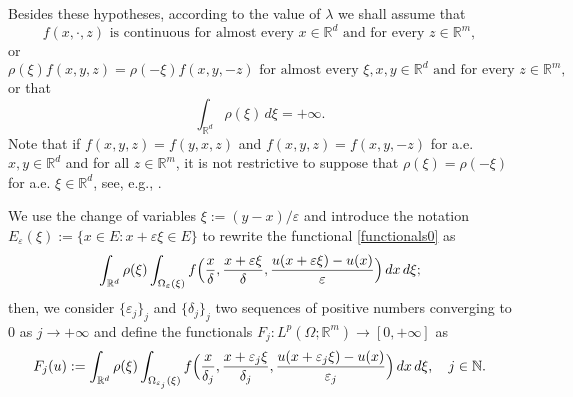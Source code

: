 \documentclass{article}
\theoremstyle{definition}
\newcommand{\e}{\varepsilon}
\newcommand{\ej}{\varepsilon_j}
\newcommand{\dej}{\delta_j}
\newcommand{\N}{\mathbb{N}}
\newcommand{\R}{\mathbb{R}}
\begin{document}
Besides these hypotheses, according to the value of $\lambda$ we shall assume that
\begin{equation} \label{f : continuous}
    \tag{H0}
f(x,\cdot,z) \text{ is continuous for almost every } x\in \R^d \text{ and for every } z\in \R^m,
\end{equation}
or 
\begin{equation}\label{H1}
       \tag{H1} \rho(\xi)f(x,y,z)=\rho(-\xi)f(x,y,-z)  \text{ for almost every } \xi,x,y\in\R^d \text{ and for every } z\in \R^m, 
        \end{equation}
    or that 
\begin{equation}\label{H2}
    \tag{H2}
    \int_{\R^d}\rho(\xi)\,d\xi =+\infty.
\end{equation}
Note that if $f(x,y,z)=f(y,x,z)$ and $f(x,y,z)=f(x,y,-z)$ for a.e. $x,y\in\R^d$ and for all $z\in\R^m$, it is not restrictive to suppose that $\rho(\xi)=\rho(-\xi)$ for a.e. $\xi\in\R^d$, see, e.g.,  \cite[Remark 2.1]{AABPT}.

\smallskip

We use the change of variables $\xi:=(y-x)/\e$ and introduce the notation $E_{\e}(\xi):=\{x\in E : x+\e\xi\in E\}$ to rewrite the functional \eqref{functionals0} as
    \begin{equation*}
\int_{\R^d}\rho(\xi)\int_{\Omega_{\e}(\xi)} f\Bigl(\frac{x}{\delta},\frac{x+\e\xi}{\delta},\frac{u(x+\e\xi)-u(x)}{\e}\Bigr)\, dx\,d\xi;
\end{equation*}
then, we consider $\{\e_j\}_j$ and $\{\dej\}_j$ two sequences of positive numbers converging to $0$ as $j\to+\infty$ and define the functionals $F_j: L^p(\Omega; \R^m)\to[0,+\infty]$ as
\begin{equation}\label{functionals}
    F_j(u)  := \int_{\R^d} \rho(\xi)\int_{\Omega_{\ej}(\xi)} f\Bigl(\frac{x}{\dej},\frac{x+\ej\xi}{\dej},\frac{u(x+\ej\xi)-u(x)}{\ej}\Bigr)\, dx\,d\xi, \quad j\in\N.
\end{equation}
\end{document}
